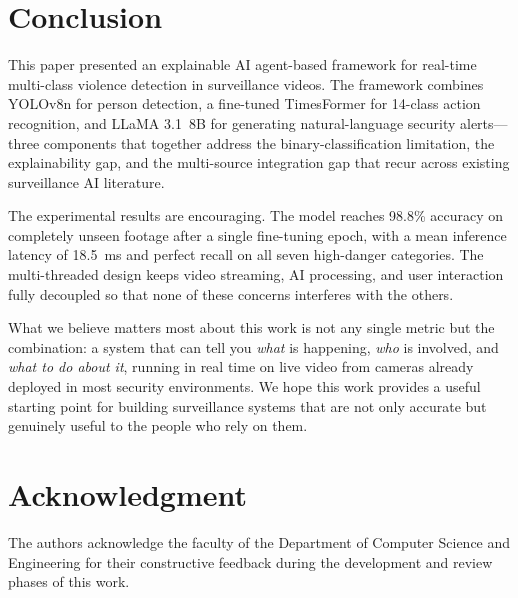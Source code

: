 \documentclass[conference]{IEEEtran}
\begin{document}
\section{Conclusion}

This paper presented an explainable AI agent-based framework for
real-time multi-class violence detection in surveillance videos.
The framework combines YOLOv8n for person detection, a fine-tuned
TimesFormer for 14-class action recognition, and LLaMA 3.1~8B for
generating natural-language security alerts---three components that
together address the binary-classification limitation, the explainability
gap, and the multi-source integration gap that recur across existing
surveillance AI literature.

The experimental results are encouraging. The model reaches 98.8\%
accuracy on completely unseen footage after a single fine-tuning epoch,
with a mean inference latency of 18.5~ms and perfect recall on all seven
high-danger categories. The multi-threaded design keeps video streaming,
AI processing, and user interaction fully decoupled so that none of these
concerns interferes with the others.

What we believe matters most about this work is not any single metric
but the combination: a system that can tell you \textit{what} is
happening, \textit{who} is involved, and \textit{what to do about it},
running in real time on live video from cameras already deployed in
most security environments. We hope this work provides a useful starting
point for building surveillance systems that are not only accurate but
genuinely useful to the people who rely on them.

\section*{Acknowledgment}

The authors acknowledge the faculty of the Department of Computer Science
and Engineering for their constructive feedback during the development
and review phases of this work.
\end{document}
